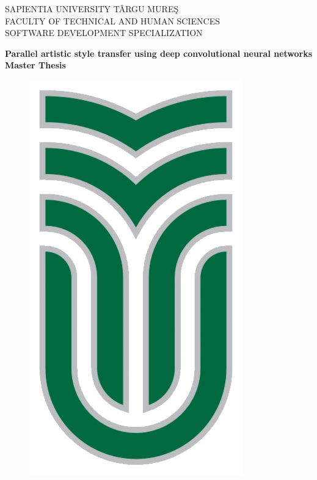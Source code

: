 \documentclass[12pt, a4paper, oneside]{book}
\theoremstyle{tetel}
\begin{document}

\newpage
\thispagestyle{empty}
\begin{center}
    \Large SAPIENTIA UNIVERSITY TÂRGU MURE\c{S}\\
    \Large FACULTY OF TECHNICAL AND HUMAN SCIENCES\\
    \Large SOFTWARE DEVELOPMENT SPECIALIZATION\\
\end{center}

\begin{center}
    \vspace{3cm}\LARGE \textbf{Parallel artistic style transfer using deep convolutional neural networks}\\
    \vspace{1cm}\LARGE \textbf{Master Thesis}\\
\end{center}

\vspace{2cm}
\begin{figure}[htb]
	\begin{center}
		\includegraphics{sapientia_logo.png}
	\end{center}
\end{figure}
\end{document}
